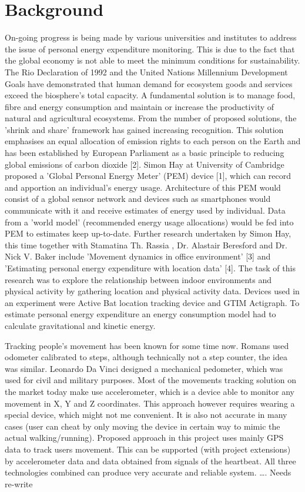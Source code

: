 \documentclass[12pt, a4paper]{report}   %
\begin{document}
\chapter{Background}
On-going progress is being made by various universities and institutes to address the issue of personal energy expenditure monitoring. This is due to the fact that the global economy is not able to meet the minimum conditions for sustainability. The Rio Declaration of 1992 and the United Nations Millennium Development Goals have demonstrated that human demand for ecosystem goods and services exceed the biosphere's total capacity. A fundamental solution is to manage food, fibre and energy consumption and maintain or increase the productivity of natural and agricultural ecosystems. From the number of proposed solutions, the 'shrink and share' framework has gained increasing recognition. This solution emphasises an equal allocation of emission rights to each person on the Earth and has been established by European Parliament as a basic principle to reducing global emissions of carbon dioxide [2].  Simon Hay at University of Cambridge proposed a 'Global Personal Energy Meter' (PEM) device [1], which can record and apportion an individual's energy usage. Architecture of this PEM would consist of a global sensor network and devices such as smartphones would communicate with it and receive estimates of energy used by individual. Data from a 'world model' (recommended energy usage allocations) would be fed into PEM to estimates keep up-to-date.  Further research undertaken by Simon Hay, this time together with Stamatina Th. Rassia , Dr. Alastair Beresford and Dr. Nick V. Baker include 'Movement dynamics in office environment' [3] and 'Estimating personal energy expenditure with location data' [4]. The task of this research was to explore the relationship between indoor environments and physical activity by gathering location and physical activity data. Devices used in an experiment were Active Bat location tracking device and GTIM Actigraph. To estimate personal energy expenditure an energy consumption model had to calculate gravitational and kinetic energy.

Tracking people's movement has been known for some time now. Romans used odometer calibrated to steps, although technically not a step counter, the idea was similar. Leonardo Da Vinci designed a mechanical pedometer, which was used for civil and military purposes. Most of the movements tracking solution on the market today make use accelerometer, which is a device able to monitor any movement in X, Y and Z coordinates. This approach however requires wearing a special device, which might not me convenient. It is also not accurate in many cases (user can cheat by only moving the device in certain way to mimic the actual walking/running).
Proposed approach in this project uses mainly GPS data to track users movement. This can be supported (with project extensions) by accelerometer data and data obtained from signals of the heartbeat. All three technologies combined can produce very accurate and reliable system.
…. Needs re-write
\end{document}
